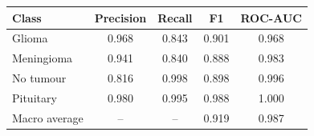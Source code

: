 \begin{tabular}{lcccc}
\toprule
Class & Precision & Recall & F1 & ROC-AUC \\
\midrule
Glioma & 0.968 & 0.843 & 0.901 & 0.968 \\
Meningioma & 0.941 & 0.840 & 0.888 & 0.983 \\
No tumour & 0.816 & 0.998 & 0.898 & 0.996 \\
Pituitary & 0.980 & 0.995 & 0.988 & 1.000 \\
\midrule
Macro average & -- & -- & 0.919 & 0.987 \\
\bottomrule
\end{tabular}